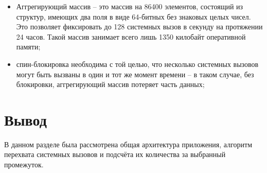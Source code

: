 \begin{itemize}
	\item Аггрегирующий массив -- это массив на 86400 элементов, состоящий из структур, имеющих два поля в виде 64-битных без знаковых целых чисел. Это позволяет фиксировать до 128 системных вызов в секунду на протяжении 24 часов. Такой массив занимает всего лишь 1350 килобайт оперативной памяти;
	
	\item спин-блокировка необходима с той целью, что несколько системных вызовов могут быть вызваны в один и тот же момент времени -- в таком случае, без блокировки, аггрегирующий массив потеряет часть данных;
\end{itemize}

\section*{Вывод}

В данном разделе была рассмотрена общая архитектура приложения, алгоритм перехвата системных вызовов и подсчёта их количества за выбранный промежуток.


